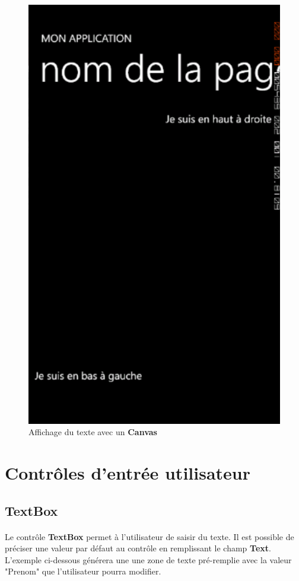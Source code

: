 \documentclass[twoside,UTF8]{EPURapport}
\begin{document}
\begin{figure}[H]
	\center
	\includegraphics[scale=0.3]{images/canvas.png}
	\caption{Affichage du texte avec un \textbf{Canvas}}
\end{figure}

	\section{Contrôles d'entrée utilisateur}
		\subsection{TextBox}
		
\paragraph{}
Le contrôle \textbf{TextBox} permet à l'utilisateur de saisir du texte. Il est possible de préciser une valeur par défaut au  contrôle en remplissant le champ \textbf{Text}. L'exemple ci-dessous générera une une zone de texte pré-remplie avec la valeur "Prenom" que l'utilisateur pourra modifier.
\end{document}

